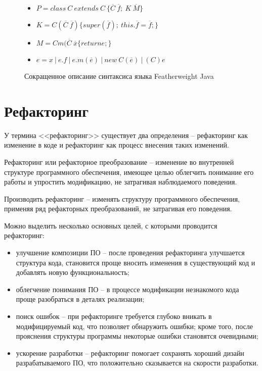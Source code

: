 \begin{figure}[H]
\begin{itemize}
    \item[] $P = class\ C\ extends\ C\ \{\overline{C}\ \overline{f};\ K\ \overline{M}\}$
    \item[] $K = C(\overline{C}\ \overline{f})\{super(\overline{f});\ this.\overline{f} = \overline{f};\}$
    \item[] $M = C m(\overline{C}\ \overline{x}\{ return e; \}$
    \item[] $e = x\ |\ e.f\ |\ e.m(\overline{e})\ |\ new\ C(\overline{e})\ |\ (C)e$
    \caption{Сокращенное описание синтаксиса языка Featherweight Java}
    \label{fj-syntax}
\end{itemize}
\end{figure}
\section{Рефакторинг}
У термина <<рефакторинг>> существует два определения -- рефакторинг как изменение в коде и рефакторинг как процесс внесения таких изменений.
\begin{definition}
Рефакторинг или рефакторное преобразование -- изменение во внутренней структуре программного обеспечения,
имеющее целью облегчить понимание его работы и упростить модификацию, не затрагивая наблюдаемого поведения.
\end{definition}
\begin{definition}
Производить рефакторинг -- изменять структуру программного обеспечения, применяя
ряд рефакторных преобразований, не затрагивая его поведения.
\end{definition}
Можно выделить несколько основных целей, с которыми проводится рефакторинг:
\begin{itemize}
    \item улучшение композиции ПО -- после проведения рефакторинга улучшается структура кода,
    становится проще вносить изменения в существующий код и добавлять новую функциональность;
    \item облегчение понимания ПО -- в процессе модификации незнакомого кода проще разобраться в деталях реализации;
    \item поиск ошибок -- при рефакторинге требуется глубоко вникать в модифицируемый код, что позволяет обнаружить ошибки;
    кроме того, после прояснения структуры программы некоторые ошибки становятся очевидными;
    \item ускорение разработки -- рефакторинг помогает сохранять хороший дизайн разрабатываемого ПО,
    что положительно сказывается на скорости разработки.
\end{itemize}
